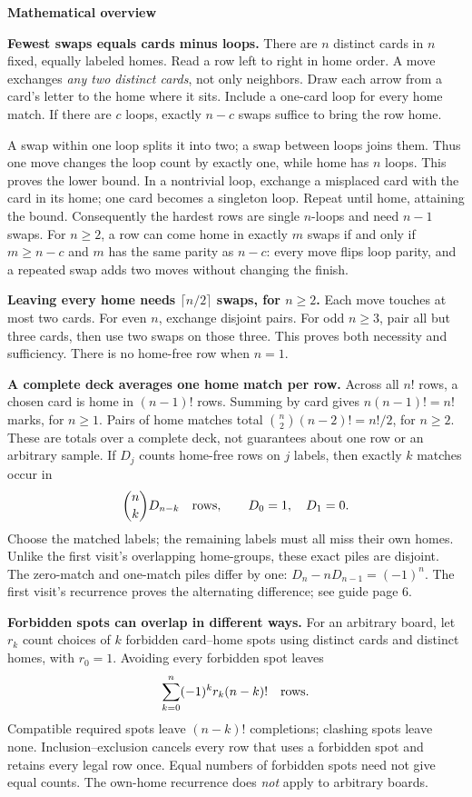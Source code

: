 \documentclass[11pt]{article}
\newcommand{\head}[1]{\par\textbf{\large #1}\par}
\begin{document}
\head{Mathematical overview}
\textbf{Fewest swaps equals cards minus loops.} There are $n$ distinct cards in $n$ fixed, equally labeled homes. Read a row left to right in home order. A move exchanges \emph{any two distinct cards}, not only neighbors. Draw each arrow from a card's letter to the home where it sits. Include a one-card loop for every home match. If there are $c$ loops, exactly $n-c$ swaps suffice to bring the row home.

A swap within one loop splits it into two; a swap between loops joins them. Thus one move changes the loop count by exactly one, while home has $n$ loops. This proves the lower bound. In a nontrivial loop, exchange a misplaced card with the card in its home; one card becomes a singleton loop. Repeat until home, attaining the bound. Consequently the hardest rows are single $n$-loops and need $n-1$ swaps. For $n\ge2$, a row can come home in exactly $m$ swaps if and only if $m\ge n-c$ and $m$ has the same parity as $n-c$: every move flips loop parity, and a repeated swap adds two moves without changing the finish.

\textbf{Leaving every home needs $\lceil n/2\rceil$ swaps, for $n\ge2$.} Each move touches at most two cards. For even $n$, exchange disjoint pairs. For odd $n\ge3$, pair all but three cards, then use two swaps on those three. This proves both necessity and sufficiency. There is no home-free row when $n=1$.

\textbf{A complete deck averages one home match per row.} Across all $n!$ rows, a chosen card is home in $(n-1)!$ rows. Summing by card gives $n(n-1)!=n!$ marks, for $n\ge1$. Pairs of home matches total $\binom n2(n-2)!=n!/2$, for $n\ge2$. These are totals over a complete deck, not guarantees about one row or an arbitrary sample. If $D_j$ counts home-free rows on $j$ labels, then exactly $k$ matches occur in
\[
\binom nk D_{n-k}\quad\hbox{rows},\qquad D_0=1,\quad D_1=0.
\]
Choose the matched labels; the remaining labels must all miss their own homes. Unlike the first visit's overlapping home-groups, these exact piles are disjoint. The zero-match and one-match piles differ by one: $D_n-nD_{n-1}=(-1)^n$. The first visit's recurrence proves the alternating difference; see guide page 6.

\textbf{Forbidden spots can overlap in different ways.} For an arbitrary board, let $r_k$ count choices of $k$ forbidden card--home spots using distinct cards and distinct homes, with $r_0=1$. Avoiding every forbidden spot leaves
\[
\sum_{k=0}^{n}(-1)^k r_k(n-k)!\quad\hbox{rows}.
\]
Compatible required spots leave $(n-k)!$ completions; clashing spots leave none. Inclusion--exclusion cancels every row that uses a forbidden spot and retains every legal row once. Equal numbers of forbidden spots need not give equal counts. The own-home recurrence does \emph{not} apply to arbitrary boards.
\end{document}
